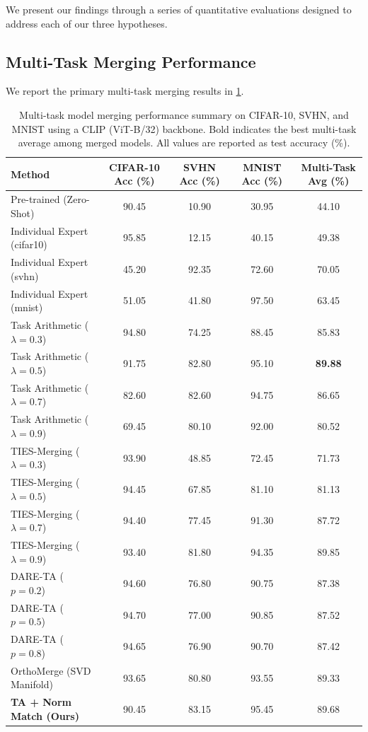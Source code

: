 \documentclass{article}
\begin{document}
We present our findings through a series of quantitative evaluations designed to address each of our three hypotheses.

\subsection{Multi-Task Merging Performance}

We report the primary multi-task merging results in \cref{tab:multi_task_results}. 

\begin{table}[t]
\caption{Multi-task model merging performance summary on CIFAR-10, SVHN, and MNIST using a CLIP (ViT-B/32) backbone. Bold indicates the best multi-task average among merged models. All values are reported as test accuracy (\%).}
\label{tab:multi_task_results}
\vskip 0.05in
\begin{center}
\begin{small}
\begin{sc}
\begin{tabular}{lcccc}
\toprule
Method & CIFAR-10 Acc (\%) & SVHN Acc (\%) & MNIST Acc (\%) & Multi-Task Avg (\%) \\
\midrule
Pre-trained (Zero-Shot) & 90.45 & 10.90 & 30.95 & 44.10 \\
\midrule
Individual Expert (cifar10) & 95.85 & 12.15 & 40.15 & 49.38 \\
Individual Expert (svhn) & 45.20 & 92.35 & 72.60 & 70.05 \\
Individual Expert (mnist) & 51.05 & 41.80 & 97.50 & 63.45 \\
\midrule
Task Arithmetic ($\lambda = 0.3$) & 94.80 & 74.25 & 88.45 & 85.83 \\
Task Arithmetic ($\lambda = 0.5$) & 91.75 & 82.80 & 95.10 & \textbf{89.88} \\
Task Arithmetic ($\lambda = 0.7$) & 82.60 & 82.60 & 94.75 & 86.65 \\
Task Arithmetic ($\lambda = 0.9$) & 69.45 & 80.10 & 92.00 & 80.52 \\
\midrule
TIES-Merging ($\lambda = 0.3$) & 93.90 & 48.85 & 72.45 & 71.73 \\
TIES-Merging ($\lambda = 0.5$) & 94.45 & 67.85 & 81.10 & 81.13 \\
TIES-Merging ($\lambda = 0.7$) & 94.40 & 77.45 & 91.30 & 87.72 \\
TIES-Merging ($\lambda = 0.9$) & 93.40 & 81.80 & 94.35 & 89.85 \\
\midrule
DARE-TA ($p = 0.2$) & 94.60 & 76.80 & 90.75 & 87.38 \\
DARE-TA ($p = 0.5$) & 94.70 & 77.00 & 90.85 & 87.52 \\
DARE-TA ($p = 0.8$) & 94.65 & 76.90 & 90.70 & 87.42 \\
\midrule
OrthoMerge (SVD Manifold) & 93.65 & 80.80 & 93.55 & 89.33 \\
\midrule
\textbf{TA + Norm Match (Ours)} & 90.45 & 83.15 & 95.45 & 89.68 \\
\bottomrule
\end{tabular}
\end{sc}
\end{small}
\end{center}
\vskip -0.15in
\end{table}
\end{document}
